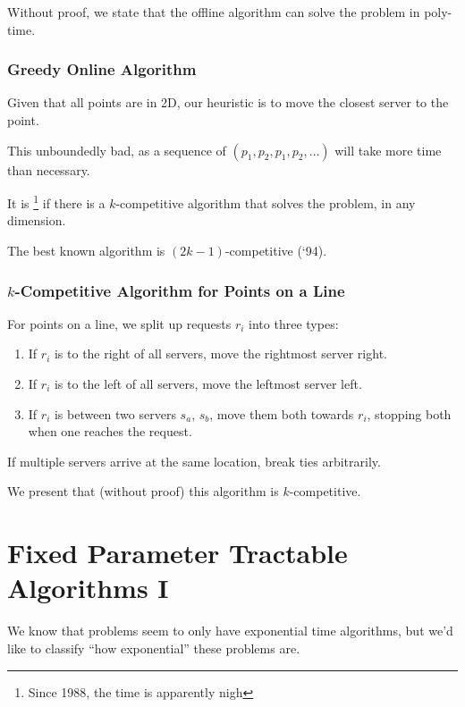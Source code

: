                 Without proof, we state that the offline algorithm can solve the problem in poly-time.

                \subsection{Greedy Online Algorithm} %
                \label{sub:greedy_online_algorithm}
                    Given that all points are in 2D, our heuristic is to move the closest server to the point.

                    This unboundedly bad, as a sequence of $(p_1, p_2, p_1, p_2, \ldots)$ will take more time than necessary.

                    It is \open\footnote{Since 1988, the time is apparently nigh} if there is a $k$-competitive algorithm that solves the problem, in any dimension.

                    The best known algorithm is $(2k-1)$-competitive (`94).
                \subsection{$k$-Competitive Algorithm for Points on a Line} %
                \label{sub:k_competitive_algorithm_for_points_on_a_line}
                    For points on a line, we split up requests $r_i$ into three types:
                    \begin{enumerate}
                        \item If $r_i$ is to the right of all servers, move the rightmost server right.
                        \item If $r_i$ is to the left of all servers, move the leftmost server left.
                        \item If $r_i$ is between two servers $s_a$, $s_b$, move them both towards $r_i$, stopping both when one reaches the request.
                    \end{enumerate}
                    If multiple servers arrive at the same location, break ties arbitrarily.

                    We present that (without proof) this algorithm is $k$-competitive.
        \chapter{Fixed Parameter Tractable Algorithms I} %
        \label{cha:fixed_parameter_tractable_algorithms_i}
            We know that \npcomplete problems seem to only have exponential time algorithms, but we'd like to classify ``how exponential'' these problems are.

